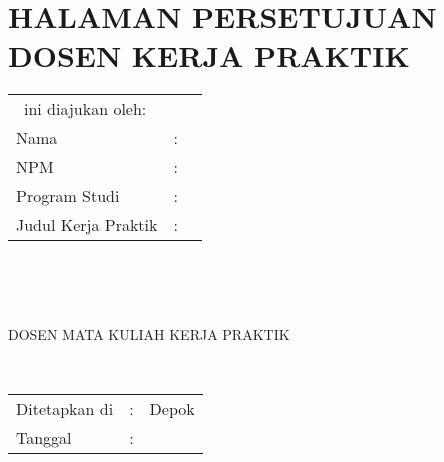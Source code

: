 %
%
%

\chapter*{HALAMAN PERSETUJUAN DOSEN KERJA PRAKTIK}
\thispagestyle{empty}
\vspace*{0.4cm}
\noindent

\noindent
\begin{tabular}{ll p{9cm}}
	\multicolumn{3}{l}{\type~ini diajukan oleh:}  \\
	Nama&: & \penulis \\
	NPM&: & \npm \\
	Program Studi&: & \program \\
	Judul Kerja Praktik&: & \judul \\
\end{tabular} \\

\vspace*{1.0cm}

\noindent {}\\[0.2cm]

\begin{center}
	DOSEN MATA KULIAH KERJA PRAKTIK\\[2cm]
\end{center}

\begin{center}
	\underline{\pembimbingSatu}\\[0.1cm]
\end{center}

\vspace*{2.0cm}

\begin{tabular}{ll l}
	Ditetapkan di&: & Depok\\
	Tanggal&: & \tanggalLulus \\
\end{tabular}

\newpage
